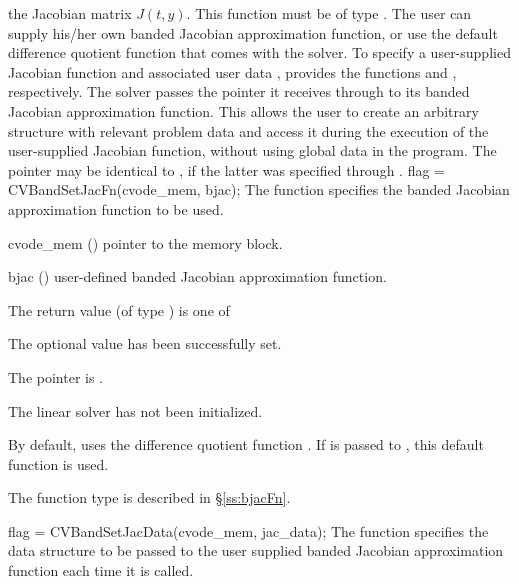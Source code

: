 the Jacobian matrix $J(t,y)$.  This function must be of type . 
The user can supply his/her own banded Jacobian approximation function, 
or use the default difference quotient function  
that comes with the {\cvband} solver.
To specify a user-supplied Jacobian function  and associated user 
data , {\cvband} provides the functions 
and , respectively.
The {\cvband} solver passes the pointer it receives through  
to its banded Jacobian approximation function. This allows the user to
create an arbitrary structure with relevant problem data and access it
during the execution of the user-supplied Jacobian function, without
using global data in the program.  The pointer  may be
identical to , if the latter was specified through .
{
  flag = CVBandSetJacFn(cvode\_mem, bjac);
}
{
  The function  specifies the banded Jacobian
  approximation function to be used.
}
{
  \begin{args}
  \item[cvode\_mem] ()
    pointer to the {\cvode} memory block.
  \item[bjac] ()
    user-defined banded Jacobian approximation function.
  \end{args}
}
{
  The return value  (of type ) is one of
  \begin{args}
  \item[\Id{CVBAND\_SUCCESS}] 
    The optional value has been successfully set.
  \item[\Id{CVBAND\_MEM\_NULL}]
    The  pointer is .
  \item[\Id{CVBAND\_LMEM\_NULL}]
    The {\cvband} linear solver has not been initialized.
  \end{args}
}
{
  By default, {\cvband} uses the difference quotient function .
  If  is passed to , this default function is used.

  The function type  is described in \S\ref{ss:bjacFn}.
}
{
  flag = CVBandSetJacData(cvode\_mem, jac\_data);
}
{
  The function  specifies the data structure
  to be passed to the user supplied banded Jacobian approximation 
  function each time it is called.
}
